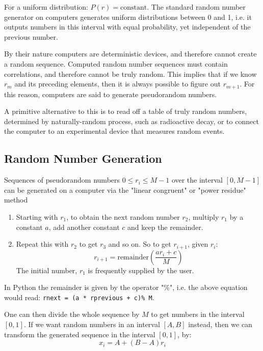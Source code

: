 \documentclass[../../../main.tex]{subfiles}
\begin{document}
For a uniform distribution: $P(r) = \mathrm{constant}$.
The standard random number generator on computers generates uniform distributions between 0 and 1, i.e. it outputs numbers in this interval with equal probability, yet independent of the previous number.

By their nature computers are deterministic devices, and therefore cannot create a random sequence.
Computed random number sequences must contain correlations, and therefore cannot be truly random.
This implies that if we know $r_m$ and its preceding elements, then it is always possible to figure out $r_{m+1}$.
For this reason, computers are said to generate pseudorandom numbers.

A primitive alternative to this is to read off a table of truly random numbers, determined by  naturally-random process, such as radioactive decay, or to connect the computer to an experimental device that measures random events.

\subsection{Random Number Generation}

Sequences of pseudorandom numbers $0 \leq r_i \leq M-1$ over the interval $[0, M-1]$ can be generated on a computer via the "linear congruent" or "power residue" method
\begin{enumerate}
    \item Starting with $r_1$, to obtain the next random number $r_2$, multiply $r_1$ by a constant $a$, add another constant $c$ and keep the remainder.
    \item Repeat this with $r_2$ to get $r_3$ and so on. So to get $r_{i+1}$, given $r_i$:
          \begin{equation*}
              r_{i+1} = \mathrm{remainder} \left( \frac{a r_i + c}{M} \right)
          \end{equation*}
          The initial number, $r_1$ is frequently supplied by the user.
\end{enumerate}

In Python the remainder is given by the operator "\%", i.e. the above equation would read: \verb|rnext = (a * rprevious + c)% M|.

One can then divide the whole sequence by $M$ to get numbers in the interval $[0,1]$.
If we want random numbers in an interval $[A,B]$ instead, then we can transform the generated sequence in the interval $[0,1]$, by:
\begin{equation*}
    x_i = A + (B-A) r_i
\end{equation*}
\end{document}
